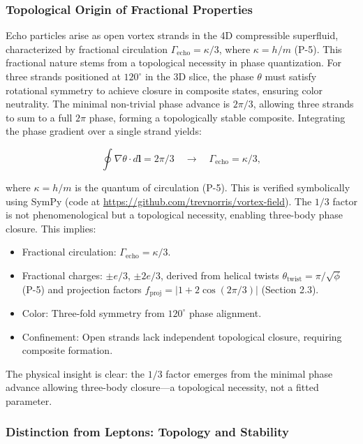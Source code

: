 \subsubsection{Topological Origin of Fractional Properties}

Echo particles arise as open vortex strands in the 4D compressible superfluid, characterized by fractional circulation $\Gamma_{\text{echo}} = \kappa/3$, where $\kappa = h/m$ (P-5). This fractional nature stems from a topological necessity in phase quantization. For three strands positioned at $120^\circ$ in the 3D slice, the phase $\theta$ must satisfy rotational symmetry to achieve closure in composite states, ensuring color neutrality. The minimal non-trivial phase advance is $2\pi/3$, allowing three strands to sum to a full $2\pi$ phase, forming a topologically stable composite. Integrating the phase gradient over a single strand yields:

\begin{equation}
\oint \nabla \theta \cdot d\mathbf{l} = 2\pi/3 \quad \rightarrow \quad \Gamma_{\text{echo}} = \kappa/3,
\end{equation}

where $\kappa = h/m$ is the quantum of circulation (P-5). This is verified symbolically using SymPy (code at \url{https://github.com/trevnorris/vortex-field}). The $1/3$ factor is not phenomenological but a topological necessity, enabling three-body phase closure. This implies:

\begin{itemize}
\item Fractional circulation: $\Gamma_{\text{echo}} = \kappa/3$.
\item Fractional charges: $\pm e/3$, $\pm 2e/3$, derived from helical twists $\theta_{\text{twist}} = \pi / \sqrt{\phi}$ (P-5) and projection factors $f_{\text{proj}} = |1 + 2 \cos(2\pi/3)|$ (Section 2.3).
\item Color: Three-fold symmetry from $120^\circ$ phase alignment.
\item Confinement: Open strands lack independent topological closure, requiring composite formation.
\end{itemize}

The physical insight is clear: the $1/3$ factor emerges from the minimal phase advance allowing three-body closure---a topological necessity, not a fitted parameter.

\subsubsection{Distinction from Leptons: Topology and Stability}

